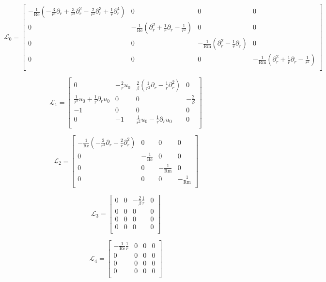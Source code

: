 \documentclass{emulateapj}
\newcommand{\beq}{\begin{equation}}
\newcommand{\eeq}{\end{equation}}
\newcommand\reye{\mathrm{Re}}
\newcommand\reym{\mathrm{Rm}}
\begin{document}
\beq
\mathcal{L}_0 = \left[\begin{matrix}
-\frac{1}{\reye} (-\frac{3}{r^4} \partial_r + \frac{3}{r^3}\partial_r^2 - \frac{2}{r^2}\partial_r^3 + \frac{1}{r}\partial_r^4) & 0 & 0 & 0 \\
0 & -\frac{1}{\reye} (\partial_r^2 + \frac{1}{r}\partial_r - \frac{1}{r^2}) & 0 & 0 \\
0 & 0 & -\frac{1}{\reym} (\partial_r^2 - \frac{1}{r} \partial_r) & 0 \\
0 & 0 & 0 & -\frac{1}{\reym} (\partial_r^2 + \frac{1}{r}\partial_r - \frac{1}{r^2}) \\
\end{matrix}\right]
\eeq

\beq
\mathcal{L}_1 = \left[\begin{matrix}
0 & -\frac{2}{r} u_0 & \frac{2}{\beta} (\frac{1}{r^2} \partial_r - \frac{1}{r}\partial_r^2) & 0 \\
\frac{1}{r^2} u_0 + \frac{1}{r}\partial_r u_0 & 0 & 0 & -\frac{2}{\beta} \\
-1 & 0 & 0 & 0 \\
0 & -1 & \frac{1}{r^2} u_0 - \frac{1}{r} \partial_r u_0 & 0 \\
\end{matrix}\right]
\eeq


\beq
\mathcal{L}_2 = \left[\begin{matrix}
-\frac{1}{\reye} (-\frac{2}{r^2}\partial_r + \frac{2}{r}\partial_r^2) & 0 & 0 & 0 \\
0 & -\frac{1}{\reye} & 0 & 0 \\
0 & 0 & -\frac{1}{\reym} & 0 \\
0 & 0 & 0 & -\frac{1}{\reym} \\
\end{matrix}\right]
\eeq

\beq
\mathcal{L}_3 = \left[\begin{matrix}
0 & 0 & -\frac{2}{\beta}\frac{1}{r} & 0 \\
0 & 0 & 0 & 0 \\
0 & 0 & 0 & 0 \\
0 & 0 & 0 & 0 \\
\end{matrix}\right]
\eeq

\beq
\mathcal{L}_4 = \left[\begin{matrix}
-\frac{1}{\reye}\frac{1}{r} & 0 & 0 & 0 \\
0 & 0 & 0 & 0 \\
0 & 0 & 0 & 0 \\
0 & 0 & 0 & 0 \\
\end{matrix}\right]
\eeq
\end{document}
